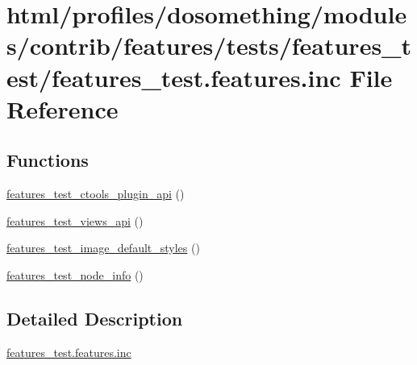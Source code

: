 \hypertarget{features__test_8features_8inc}{
\section{html/profiles/dosomething/modules/contrib/features/tests/features\_\-test/features\_\-test.features.inc File Reference}
\label{features__test_8features_8inc}
}
\subsection*{Functions}
\begin{DoxyCompactItemize}
\item 
\hyperlink{features__test_8features_8inc_aa106cfcaf92836ac13395de06abb1e33}{features\_\-test\_\-ctools\_\-plugin\_\-api} ()
\item 
\hyperlink{features__test_8features_8inc_a38b800b8d20370d227a025be9fef8bbe}{features\_\-test\_\-views\_\-api} ()
\item 
\hyperlink{features__test_8features_8inc_ac92c5b7524f0f1cb4afc07fc8fca39db}{features\_\-test\_\-image\_\-default\_\-styles} ()
\item 
\hyperlink{features__test_8features_8inc_a2f0ccd0564283397c7633a7f0b8d9fd5}{features\_\-test\_\-node\_\-info} ()
\end{DoxyCompactItemize}


\subsection{Detailed Description}
\hyperlink{features__test_8features_8inc}{features\_\-test.features.inc} 

